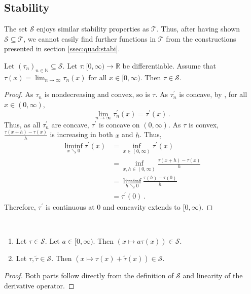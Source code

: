 \documentclass{article}
\renewcommand{\subset}{\subseteq}
\newcommand*{\mc}[1]{\mathcal{#1}}
\newcommand{\N}{\mathbb{N}}
\newcommand{\R}{\mathbb{R}}
\newcommand{\Rp}{[0, \infty)} %
\newcommand{\Rpp}{(0, \infty)} %
\newcommand{\pr}{^\prime}
\newcommand{\equationFullstop}{\, .}
\newcommand{\eqfs}{\equationFullstop}
\newcommand{\tran}{\tau}
\newcommand{\Tran}{\mc{T}}
\newcommand{\dtran}{\tran\pr}
\newcommand{\setcc}{\mc S}
\begin{document}
\subsection{Stability}
%
The set $\setcc$ enjoys similar stability properties as $\Tran$. Thus, after having shown $\setcc\subset\Tran$, we cannot easily find further functions in $\Tran$ from the constructions presented in section \ref{ssec:quad:stabi}.
%
\begin{proposition}
	Let $(\tran_n)_{n\in\N}\subset\setcc$. Let $\tran\colon\Rp\to\R$ be differentiable. Assume that $\tran(x) = \lim_{n\to\infty}\tran_n(x)$ for all $x\in\Rp$. Then $\tran\in\setcc$.
\end{proposition}
%
\begin{proof}
	As $\tran_n$ is nondecreasing and convex, so is $\tran$.
	As $\dtran_n$ is concave, by \cite[Theorem 25.7]{rockafellar70}, for all $x\in\Rpp$,
	\begin{equation}
		\lim_{n\to\infty} \dtran_n(x) = \dtran(x)
		\eqfs
	\end{equation}
	Thus, as all $\dtran_n$ are concave, $\dtran$ is concave on $\Rpp$.
	As $\tran$ is convex, $\frac{\tran(x+h)-\tran(x)}{h}$ is increasing in both $x$ and $h$. Thus,
	\begin{align*}
		\liminf_{x\searrow0} \dtran(x) 
		&= 
		\inf_{x\in\Rpp} \dtran(x)
		\\&=
		\inf_{x,h\in\Rpp} \frac{\tran(x+h)-\tran(x)}{h} 
		\\&=
		\liminf_{h\searrow0} \frac{\tran(h)-\tran(0)}{h}
		\\&=
		\dtran(0)
		\eqfs
	\end{align*}
	Therefore, $\dtran$ is continuous at $0$ and concavity extends to $\Rp$.
\end{proof}
%
\begin{proposition}\mbox{ }
	\begin{enumerate}[label=(\roman*)]
		\item Let $\tran\in\setcc$. Let $a\in\Rp$. Then $(x\mapsto a\tran(x)) \in \setcc$.
		\item Let $\tran, \tilde \tran\in \setcc$. Then $(x\mapsto \tran(x)+\tilde\tran(x)) \in \setcc$.
	\end{enumerate}
\end{proposition}
%
\begin{proof}
	Both parts follow directly from the definition of $\setcc$ and linearity of the derivative operator.
\end{proof}
%
%
%
\end{document}
